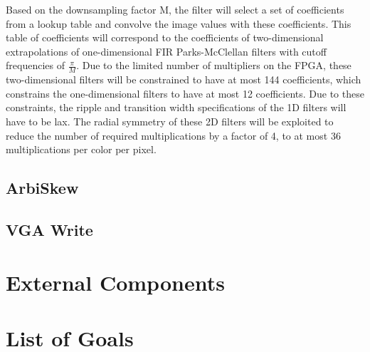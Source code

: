 \documentclass{article}
\begin{document}
Based on the downsampling factor M, the filter will select a set of coefficients from a lookup table and convolve the image values with these coefficients. This table of coefficients will correspond to the coefficients of two-dimensional extrapolations of one-dimensional FIR Parks-McClellan filters with cutoff frequencies of \( \frac{\pi}{M} \). Due to the limited number of multipliers on the FPGA, these two-dimensional filters will be constrained to have at most 144 coefficients, which constrains the one-dimensional filters to have at most 12 coefficients. Due to these constraints, the ripple and transition width specifications of the 1D filters will have to be lax. The radial symmetry of these 2D filters will be exploited to reduce the number of required multiplications by a factor of 4, to at most 36 multiplications per color per pixel.

\subsection{ArbiSkew}

\subsection{VGA Write}

\section{External Components}

\section{List of Goals}
\end{document}
